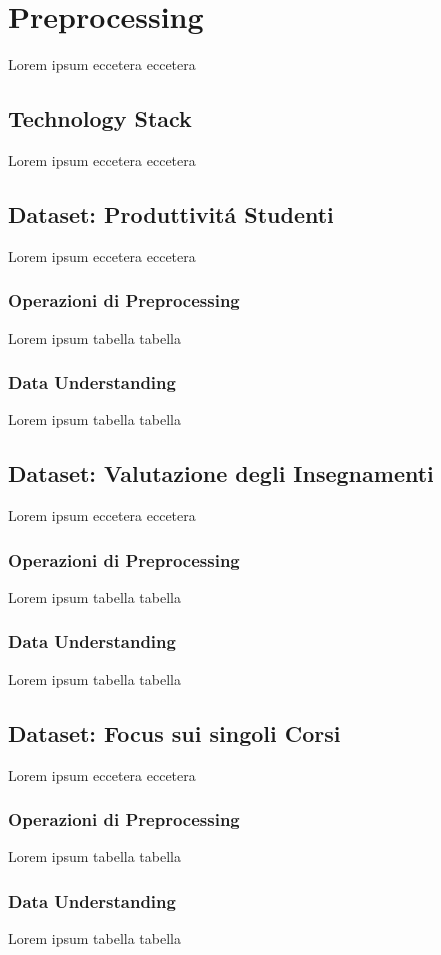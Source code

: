 \chapter{Preprocessing}

Lorem ipsum eccetera eccetera  

\section{Technology Stack}
	Lorem ipsum eccetera eccetera  

\section{Dataset: Produttivit\'a Studenti}
	Lorem ipsum eccetera eccetera  

	\subsection{Operazioni di Preprocessing}
		Lorem ipsum tabella tabella

	\subsection{Data Understanding}
		Lorem ipsum tabella tabella
	
\section{Dataset: Valutazione degli Insegnamenti}
	Lorem ipsum eccetera eccetera  

	\subsection{Operazioni di Preprocessing}
		Lorem ipsum tabella tabella

	\subsection{Data Understanding}
		Lorem ipsum tabella tabella

\section{Dataset: Focus sui singoli Corsi}
	Lorem ipsum eccetera eccetera  

	\subsection{Operazioni di Preprocessing}
		Lorem ipsum tabella tabella

	\subsection{Data Understanding}
		Lorem ipsum tabella tabella
